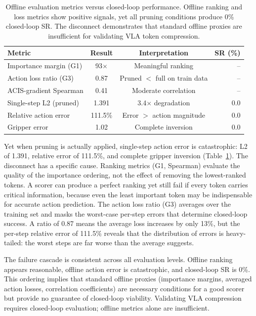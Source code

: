 \begin{table}[t]
\centering
\caption{Offline evaluation metrics versus closed-loop performance. Offline ranking and loss metrics show positive signals, yet all pruning conditions produce 0\% closed-loop SR. The disconnect demonstrates that standard offline proxies are insufficient for validating VLA token compression.}
\label{tab:offline_vs_closedloop}
\small
\begin{tabular}{@{}lccr@{}}
\toprule
Metric & Result & Interpretation & SR (\%) \\
\midrule
Importance margin (G1) & 93$\times$ & Meaningful ranking & -- \\
Action loss ratio (G3) & 0.87 & Pruned $<$ full on train data & -- \\
ACIS-gradient Spearman & 0.41 & Moderate correlation & -- \\
\midrule
Single-step L2 (pruned) & 1.391 & 3.4$\times$ degradation & 0.0 \\
Relative action error & 111.5\% & Error $>$ action magnitude & 0.0 \\
Gripper error & 1.02 & Complete inversion & 0.0 \\
\bottomrule
\end{tabular}
\end{table}

Yet when pruning is actually applied, single-step action error is catastrophic: L2 of 1.391, relative error of 111.5\%, and complete gripper inversion (Table~\ref{tab:offline_vs_closedloop}).
The disconnect has a specific cause.
Ranking metrics (G1, Spearman) evaluate the quality of the importance ordering, not the effect of removing the lowest-ranked tokens.
A scorer can produce a perfect ranking yet still fail if every token carries critical information, because even the least important token may be indispensable for accurate action prediction.
The action loss ratio (G3) averages over the training set and masks the worst-case per-step errors that determine closed-loop success.
A ratio of 0.87 means the average loss increases by only 13\%, but the per-step relative error of 111.5\% reveals that the distribution of errors is heavy-tailed: the worst steps are far worse than the average suggests.

The failure cascade is consistent across all evaluation levels.
Offline ranking appears reasonable, offline action error is catastrophic, and closed-loop SR is 0\%.
This ordering implies that standard offline proxies (importance margins, averaged action losses, correlation coefficients) are necessary conditions for a good scorer but provide no guarantee of closed-loop viability.
Validating VLA compression requires closed-loop evaluation; offline metrics alone are insufficient.

